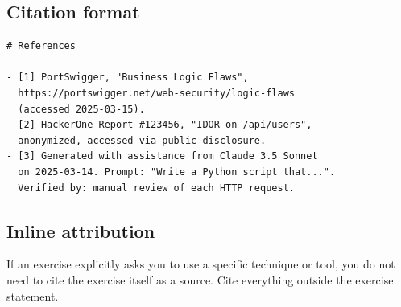 \subsection*{Citation format}

\begin{verbatim}
# References

- [1] PortSwigger, "Business Logic Flaws",
  https://portswigger.net/web-security/logic-flaws
  (accessed 2025-03-15).
- [2] HackerOne Report #123456, "IDOR on /api/users",
  anonymized, accessed via public disclosure.
- [3] Generated with assistance from Claude 3.5 Sonnet
  on 2025-03-14. Prompt: "Write a Python script that...".
  Verified by: manual review of each HTTP request.
\end{verbatim}

\subsection*{Inline attribution}

If an exercise explicitly asks you to use a specific technique or
tool, you do not need to cite the exercise itself as a source.
Cite everything outside the exercise statement.
